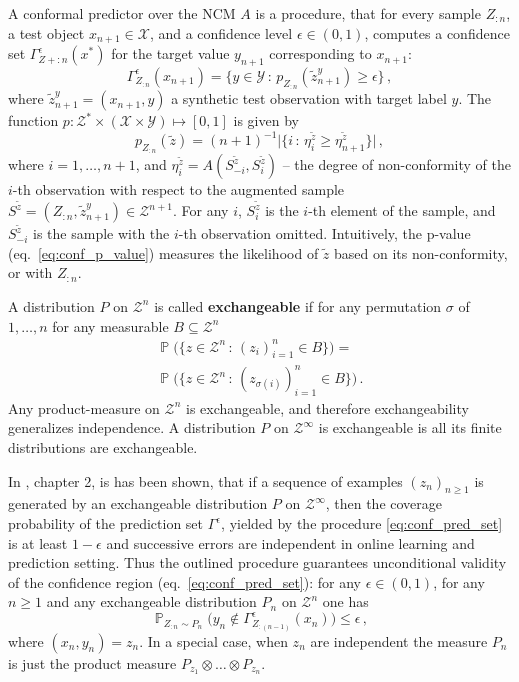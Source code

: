 \documentclass{ITaSconf}
\newcommand{\pr}{\mathop{\mathbb{P}}\nolimits}
\newcommand{\Xcal}{\mathcal{X}}
\newcommand{\Ycal}{\mathcal{Y}}
\newcommand{\Zcal}{\mathcal{Z}}
\begin{document}
A conformal predictor over the NCM $A$ is a procedure, that for every sample $Z_{:n}$,
a test object $x_{n+1} \in \Xcal$, and a confidence level $\epsilon\in(0,1)$, computes
a confidence set $\Gamma_{Z+{:n}}^\epsilon(x^*)$ for the target value $y_{n+1}$ corresponding
to $x_{n+1}$:
\begin{equation} \label{eq:conf_pred_set}
  \Gamma_{Z_{:n}}^\epsilon(x_{n+1})
    = \bigl\{ y\in \Ycal \,:\, p_{Z_{:n}}(\tilde{z}^y_{n+1}) \geq \epsilon \bigr\} \,,
\end{equation}
where $\tilde{z}^y_{n+1} = (x_{n+1}, y)$ a synthetic test observation with target
label $y$. The function $p:\Zcal^*\times (\Xcal\times \Ycal)\mapsto [0,1]$ is given
by
\begin{equation} \label{eq:conf_p_value}
  p_{Z_{:n}}(\tilde{z})
    = (n+1)^{-1} \bigl\lvert\{ i \,:\,
      \eta_i^{\tilde{z}} \geq \eta_{n+1}^{\tilde{z}} \}\bigr\rvert \,,
\end{equation}
where $i=1,\ldots, n+1$, and $\eta_i^{\tilde{z}} = A(S^{\tilde{z}}_{-i}, S^{\tilde{z}}_i)$
-- the degree of non-conformity of the $i$-th observation with respect to the augmented
sample $S^{\tilde{z}} = (Z_{:n}, {\tilde{z}}^y_{n+1}) \in \Zcal^{n+1}$. For any $i$,
$S^{\tilde{z}}_i$ is the $i$-th element of the sample, and $S^{\tilde{z}}_{-i}$ is
the sample with the $i$-th observation omitted. Intuitively, the p-value (eq.~\ref{eq:conf_p_value})
measures the likelihood of $\tilde{z}$ based on its non-conformity, or with $Z_{:n}$.

A distribution $P$ on $\Zcal^n$ is called \textbf{exchangeable} if for any permutation
$\sigma$ of ${1,\ldots,n}$ for any measurable $B\subseteq \Zcal^n$
\begin{multline} \label{eq:exchangeability}
  \pr\bigl(\{z\in\Zcal^n \,:\, (z_i)_{i=1}^n\in B\}\bigr)
  = \\ \pr\bigl(\{z\in\Zcal^n \,:\, (z_{\sigma(i)})_{i=1}^n \in B\} \bigr)\,.
\end{multline}
Any product-measure on $\Zcal^n$ is exchangeable, and therefore exchangeability
generalizes independence. A distribution $P$ on $\Zcal^\infty$ is exchangeable
is all its finite distributions are exchangeable.

In \cite{Vovketal2005}, chapter 2, is has been shown, that if a sequence of examples
$(z_n)_{n \geq1}$ is generated by an exchangeable distribution $P$ on $\Zcal^\infty$,
then the coverage probability of the prediction set $\Gamma^\epsilon$, yielded by
the procedure \ref{eq:conf_pred_set} is at least $1-\epsilon$ and successive errors
are independent in online learning and prediction setting. Thus the outlined procedure
guarantees unconditional validity of the confidence region (eq.~\ref{eq:conf_pred_set}):
for any $\epsilon \in (0,1)$, for any $n\geq1$ and any exchangeable distribution
$P_n$ on $\Zcal^n$ one has
\begin{equation} \label{eq:conservative_coverage}
  \pr_{Z_{:n}\sim P_n} \bigl(
    y_n \notin \Gamma^\epsilon_{Z_{:(n-1)}}(x_n)
  \bigr) \leq \epsilon \,,
\end{equation} 
where $(x_n, y_n) = z_n$. In a special case, when $z_n$ are independent the measure
$P_n$ is just the product measure $P_{z_1} \otimes \ldots \otimes P_{z_n}$.
\end{document}

